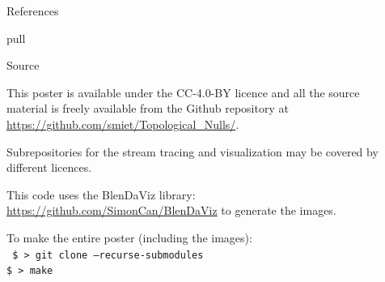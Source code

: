 \documentclass[final]{beamer}
\newlength{\sepwid}
\newlength{\onecolwid}
\begin{document}
\begin{frame}[t]
\begin{columns}[t]
\begin{column}{\onecolwid}
\begin{block}{References}
\nocite{*} %
\small{
\vspace{0.75in}}

\end{block}pull

\begin{block}{Source}
\begin{centering}
    \hfill
    \hfill
\end{centering}
This poster is available under the  CC-4.0-BY  licence and all the source material is freely
available from the Github repository at \url{https://github.com/smiet/Topological_Nulls/}.

Subrepositories for the stream tracing and visualization may be covered by different licences. 

This code uses the BlenDaViz library: \url{https://github.com/SimonCan/BlenDaViz} to generate the images. 

    To make the entire poster (including the images):\\
    \texttt{
    \$ > git clone --recurse-submodules\\
    \$ > make
  }


\end{block}

\end{column} %

\begin{column}{\sepwid}\end{column} %


\end{columns} %

\end{frame} %
\end{document}
